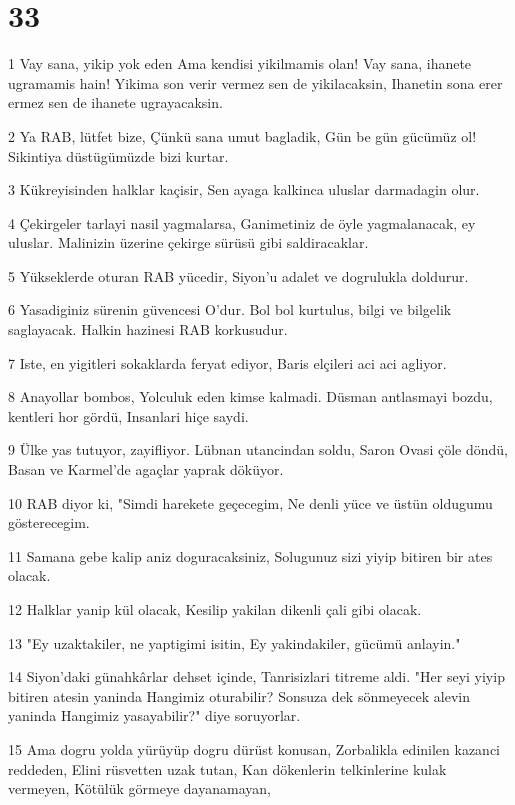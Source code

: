 \chapter{33}

\par 1 Vay sana, yikip yok eden Ama kendisi yikilmamis olan! Vay sana, ihanete ugramamis hain! Yikima son verir vermez sen de yikilacaksin, Ihanetin sona erer ermez sen de ihanete ugrayacaksin.
\par 2 Ya RAB, lütfet bize, Çünkü sana umut bagladik, Gün be gün gücümüz ol! Sikintiya düstügümüzde bizi kurtar.
\par 3 Kükreyisinden halklar kaçisir, Sen ayaga kalkinca uluslar darmadagin olur.
\par 4 Çekirgeler tarlayi nasil yagmalarsa, Ganimetiniz de öyle yagmalanacak, ey uluslar. Malinizin üzerine çekirge sürüsü gibi saldiracaklar.
\par 5 Yükseklerde oturan RAB yücedir, Siyon'u adalet ve dogrulukla doldurur.
\par 6 Yasadiginiz sürenin güvencesi O'dur. Bol bol kurtulus, bilgi ve bilgelik saglayacak. Halkin hazinesi RAB korkusudur.
\par 7 Iste, en yigitleri sokaklarda feryat ediyor, Baris elçileri aci aci agliyor.
\par 8 Anayollar bombos, Yolculuk eden kimse kalmadi. Düsman antlasmayi bozdu, kentleri hor gördü, Insanlari hiçe saydi.
\par 9 Ülke yas tutuyor, zayifliyor. Lübnan utancindan soldu, Saron Ovasi çöle döndü, Basan ve Karmel'de agaçlar yaprak döküyor.
\par 10 RAB diyor ki, "Simdi harekete geçecegim, Ne denli yüce ve üstün oldugumu gösterecegim.
\par 11 Samana gebe kalip aniz doguracaksiniz, Solugunuz sizi yiyip bitiren bir ates olacak.
\par 12 Halklar yanip kül olacak, Kesilip yakilan dikenli çali gibi olacak.
\par 13 "Ey uzaktakiler, ne yaptigimi isitin, Ey yakindakiler, gücümü anlayin."
\par 14 Siyon'daki günahkârlar dehset içinde, Tanrisizlari titreme aldi. "Her seyi yiyip bitiren atesin yaninda Hangimiz oturabilir? Sonsuza dek sönmeyecek alevin yaninda Hangimiz yasayabilir?" diye soruyorlar.
\par 15 Ama dogru yolda yürüyüp dogru dürüst konusan, Zorbalikla edinilen kazanci reddeden, Elini rüsvetten uzak tutan, Kan dökenlerin telkinlerine kulak vermeyen, Kötülük görmeye dayanamayan,
